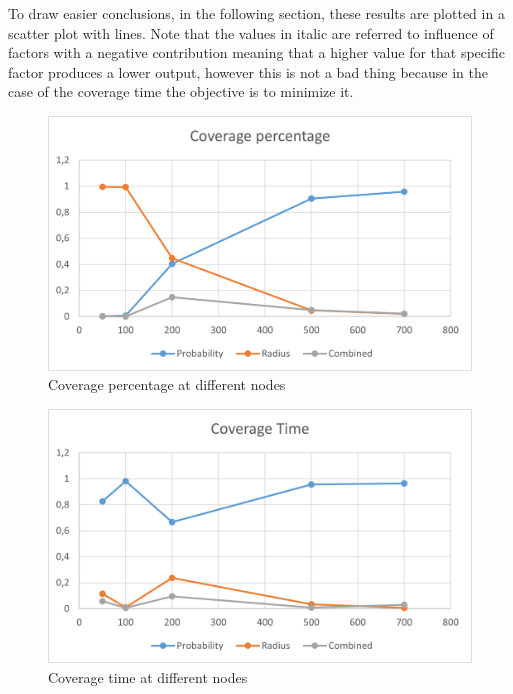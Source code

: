 To draw easier conclusions, in the following section, these results are plotted in a scatter plot with lines. Note that the values in italic are referred to influence of factors with a negative contribution meaning that a higher value for that specific factor produces a lower output, however this is not a bad thing because in the case of the coverage time the objective is to minimize it.

\begin{figure}[H]
\centering
    \includegraphics[width= 1\textwidth]{./images/CoveragePercentageWithNodes.png}
    \caption{Coverage percentage at different nodes}
    \label{fig:CovPercInfluence}
\end{figure}


\begin{figure}[H]\label{fig:CovTimeInfluence}
\centering
    \includegraphics[width= 1\textwidth]{./images/CoverageTimeWithNodes.png}
    \caption{Coverage time at different nodes}
\end{figure}

